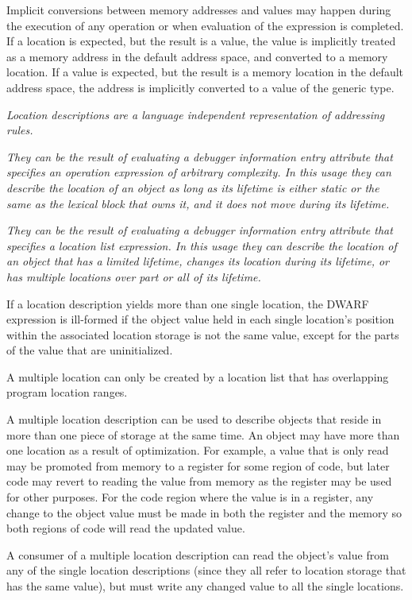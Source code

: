 Implicit conversions between memory addresses and values may happen
during the execution of any operation or when evaluation of the
expression is completed. If a location is expected, but the result is
a value, the value is implicitly treated as a memory address in the
default address space, and converted to a memory location. If a value
is expected, but the result is a memory location in the default
address space, the address is implicitly converted to a value of the
generic type.

\textit{Location descriptions are a language independent representation of
addressing rules.}

\textit{They can be the result of evaluating a debugger information entry
attribute that specifies an operation expression of arbitrary
complexity. In this usage they can describe the location of an object
as long as its lifetime is either static or the same as the lexical
block that owns it, and it does not move during its lifetime.}

\textit{They can be the result of evaluating a debugger information entry
attribute that specifies a location list expression. In this usage they
can describe the location of an object that has a limited lifetime,
changes its location during its lifetime, or has multiple locations over
part or all of its lifetime.}

If a location description yields more than one single location,
the DWARF expression is ill-formed if the object value held in each
single location’s position within the associated location
storage is not the same value, except for the parts of the value that
are uninitialized.

A multiple location can only be created by a location list that has
overlapping program location ranges.

A multiple location description can be used to describe objects that
reside in more than one piece of storage at the same time. An object
may have more than one location as a result of optimization. For
example, a value that is only read may be promoted from memory to a
register for some region of code, but later code may revert to reading
the value from memory as the register may be used for other purposes.
For the code region where the value is in a register, any change to
the object value must be made in both the register and the memory so
both regions of code will read the updated value.

A consumer of a multiple location description can read the object’s
value from any of the single location descriptions (since they all
refer to location storage that has the same value), but must write any
changed value to all the single locations.

